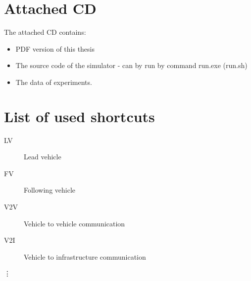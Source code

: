 \documentclass[11pt,twoside,a4paper]{book}
\begin{document}
 



\nocite{russell2002,vokrinek2013,fernandes2010}





%
{
\def\CS{$\cal C\kern-0.1667em\lower.5ex\hbox{$\cal S$}\kern-0.075em $}

}



\appendix

\chapter{Attached CD}
The attached CD contains:

\begin{itemize}
\item PDF version of this thesis
\item The source code of the simulator - can by run by command run.exe (run.sh)
\item The data of experiments.
\end{itemize}

\section*{}


\chapter{List of used shortcuts}

\begin{description}
\item[LV] Lead vehicle
\item[FV] Following vehicle
\item[V2V] Vehicle to vehicle communication
\item[V2I] Vehicle to infrastructure communication
\end{description}
\vdots

\end{document}
